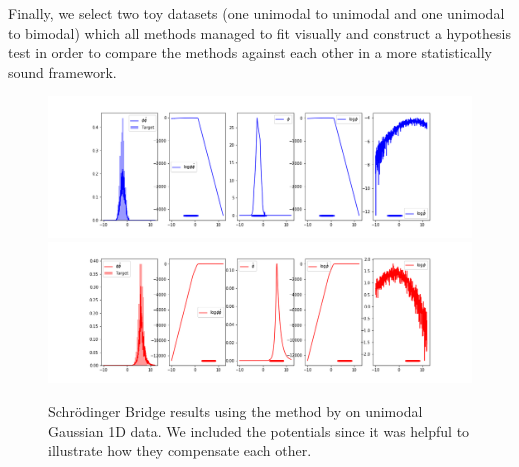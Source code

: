 \documentclass[a4paper,12pt,twoside,openright]{report}
\theoremstyle{definition}
\begin{document}
Finally, we select two toy datasets (one unimodal to unimodal and one unimodal to bimodal) which all methods managed to fit visually and construct a hypothesis test in order to compare the methods against each other in a more statistically sound framework. 
\begin{figure}[t]
    \centering
    \includegraphics[scale=0.4,trim={2.3cm 0.2cm 1.5cm 0}, clip]{images/Pavon/Forward_unimodal_working_pavon_relu_nn500.png}\\\vspace{-0.2cm}
    \includegraphics[scale=0.4,trim={2.3cm 0 1.5cm 1.5cm}, clip]{images/Pavon/Backward_unimodal_working_pavon_relu_nn500.png} 
    \caption{Schrödinger Bridge results using the method by \cite{pavon2018data} on unimodal Gaussian 1D data. We included the potentials since it was helpful to illustrate how they compensate each other. }
    \label{fig:driftpavon}
\end{figure}
\end{document}
